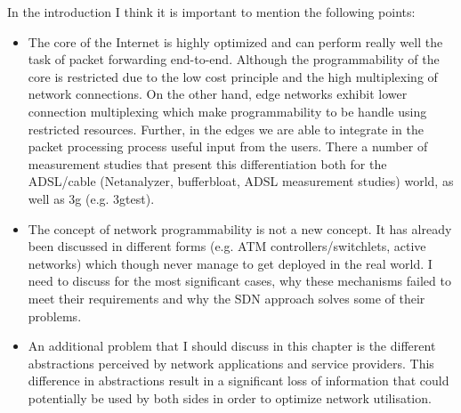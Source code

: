 In the introduction I think it is important to mention the following points:
\begin{itemize}
\item The core of the Internet is highly optimized and can perform really
well the task of packet forwarding end-to-end. Although the programmability
of the core is restricted due to the low cost principle and the high
multiplexing of network connections. On the other hand, edge
networks exhibit lower connection multiplexing which make programmability 
to be handle using restricted resources. Further, in the edges we are able 
to integrate in the
packet processing process useful input from the users. There a number of
measurement studies that present this differentiation both for the ADSL/cable
(Netanalyzer, bufferbloat, ADSL measurement studies) world, as well as 3g 
(e.g. 3gtest).
\item The concept of network programmability is not a new concept. It has already
been discussed in different forms (e.g. ATM controllers/switchlets, active networks) 
which though never manage to get deployed in the real world. I need to discuss
for the most significant cases, why these mechanisms failed to meet their
requirements and why the SDN approach solves some of their problems. 
\item An additional problem that I should discuss in this chapter is the
different abstractions perceived by network applications and service
providers. This difference in abstractions result in a significant loss of
information that could potentially be used by both sides in order to optimize
network utilisation.

\end{itemize}


